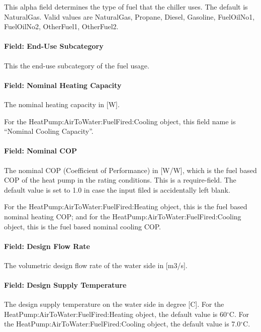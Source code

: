 This alpha field determines the type of fuel that the chiller uses. The default is NaturalGas. Valid values are NaturalGas, Propane, Diesel, Gasoline, FuelOilNo1, FuelOilNo2, OtherFuel1, OtherFuel2.

\paragraph{Field: End-Use Subcategory}

This the end-use subcategory of the fuel usage.

\paragraph{Field: Nominal Heating Capacity}

The nominal heating capacity in [W].

For the HeatPump:AirToWater:FuelFired:Cooling object, this field name is ``Nominal Cooling Capacity''.

\paragraph{Field: Nominal COP}

The nominal COP (Coefficient of Performance) in [W/W], which is the fuel based COP of the heat pump in the rating conditions. This is a require-field. The default value is set to 1.0 in case the input filed is accidentally left blank.

For the HeatPump:AirToWater:FuelFired:Heating object, this is the fuel based nominal heating COP; and for the HeatPump:AirToWater:FuelFired:Cooling object, this is the fuel based nominal cooling COP.

\paragraph{Field: Design Flow Rate}

The volumetric design flow rate of the water side in [m3/s].

\paragraph{Field: Design Supply Temperature}

The design supply temperature on the water side in degree [C]. For the HeatPump:AirToWater:FuelFired:Heating object, the default value is 60$^\circ$C. For the HeatPump:AirToWater:FuelFired:Cooling object, the default value is 7.0$^\circ$C.

